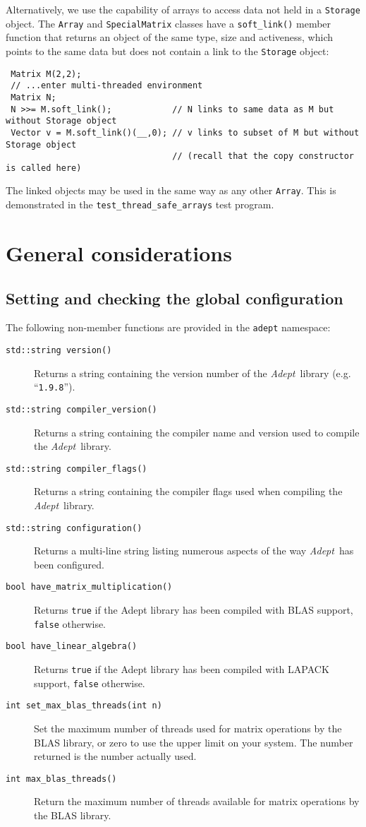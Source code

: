 \documentclass[a4,oneside]{book}
\def\codesize{\small}
\def\Adept{\emph{Adept}}
\def\code#1{{\codesize\texttt{#1}}}
\def\citem#1{\item[{\codesize\texttt{#1}}]}
\begin{document}
Alternatively, we use the capability of arrays to access data not held
in a \code{Storage} object. The \code{Array} and \code{SpecialMatrix}
classes have a \code{soft\_link()} member function that returns an
object of the same type, size and activeness, which points to the same
data but does not contain a link to the \code{Storage} object:
\begin{lstlisting}
 Matrix M(2,2);
 // ...enter multi-threaded environment
 Matrix N;
 N >>= M.soft_link();            // N links to same data as M but without Storage object
 Vector v = M.soft_link()(__,0); // v links to subset of M but without Storage object
                                 // (recall that the copy constructor is called here) 
\end{lstlisting}
The linked objects may be used in the same way as any other
\code{Array}. This is demonstrated in the
\code{test\_thread\_safe\_arrays} test program.

\chapter{General considerations}
\label{chap:gen}

\section{Setting and checking the global configuration}
\label{sec:settings}
\noindent The following non-member functions are provided in the
\code{adept} namespace:
\begin{description}
\citem{std::string version()} Returns a string containing the version
number of the \Adept\ library (e.g. ``\code{1.9.8}'').
\citem{std::string compiler\_version()} Returns a string containing
the compiler name and version used to compile the \Adept\ library.
\citem{std::string compiler\_flags()} Returns a string containing the
compiler flags used when compiling the \Adept\ library.
\citem{std::string configuration()} Returns a multi-line string
listing numerous aspects of the way \Adept\ has been configured.
\citem{bool have\_matrix\_multiplication()} Returns \code{true} if the
Adept library has been compiled with BLAS support, \code{false}
otherwise.
\citem{bool have\_linear\_algebra()} Returns \code{true} if the
Adept library has been compiled with LAPACK support, \code{false}
otherwise.
\citem{int set\_max\_blas\_threads(int n)} Set the maximum number of
threads used for matrix operations by the BLAS library, or zero to use
the upper limit on your system. The number returned is the number
actually used.  
\citem{int max\_blas\_threads()} Return the maximum number of
threads available for matrix operations by the BLAS library.
%
\end{description}
\end{document}
